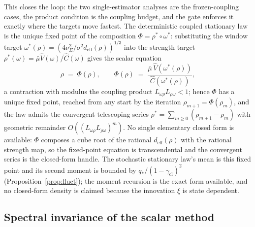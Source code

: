 This closes the loop: the two single-estimator analyses are the frozen-coupling cases, the product condition is the coupling budget, and the gate enforces it exactly where the targets move fastest.
The deterministic coupled stationary law is the unique fixed point of the composition $\Phi = \rho^*\circ\omega^*$: substituting the window target $\omega^*(\rho) = (4\nu^2_\Sigma/\sigma^2 d_{\mathrm{eff}}(\rho))^{1/3}$ into the strength target $\rho^*(\omega) = \bar\mu\widehat V(\omega)/\widehat C(\omega)$ gives the scalar equation
\[
\rho \;=\; \Phi(\rho), \qquad
\Phi(\rho) \;=\; \frac{\bar\mu\,\widehat V(\omega^*(\rho))}{\widehat C(\omega^*(\rho))},
\]
a contraction with modulus the coupling product $L_{\omega\rho}L_{\rho\omega} < 1$; hence $\Phi$ has a unique fixed point, reached from any start by the iteration $\rho_{m+1} = \Phi(\rho_m)$, and the law admits the convergent telescoping series $\rho^* = \sum_{m\ge0}(\rho_{m+1}-\rho_m)$ with geometric remainder $O((L_{\omega\rho}L_{\rho\omega})^m)$.
No single elementary closed form is available: $\Phi$ composes a cube root of the rational $d_{\mathrm{eff}}(\rho)$ with the rational strength map, so the fixed-point equation is transcendental and the convergent series is the closed-form handle.
The stochastic stationary law's mean is this fixed point and its second moment is bounded by $q_*/(1-\gamma_{\mathrm{cl}})^2$ (Proposition~\ref{prop:fluct}); the moment recursion is the exact form available, and no closed-form density is claimed because the innovation $\xi$ is state dependent.

\subsection{Spectral invariance of the scalar method}
\label{app:invariance}

